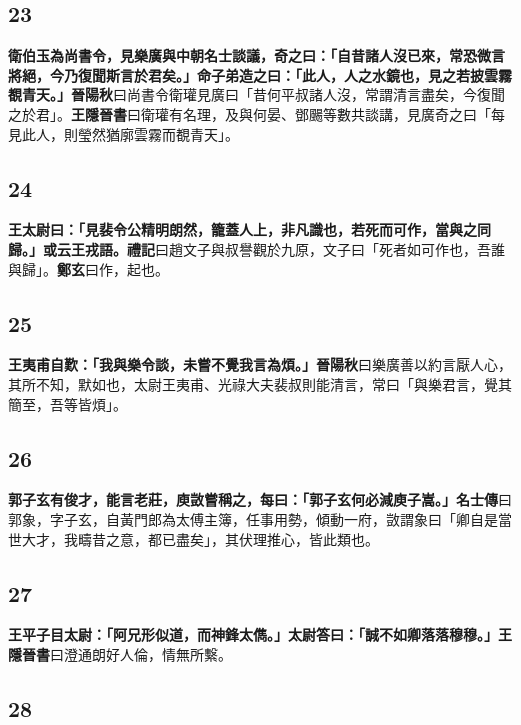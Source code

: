\subsection*{23}

\textbf{衛伯玉為尚書令，見樂廣與中朝名士談議，奇之曰：「自昔諸人沒已來，常恐微言將絕，今乃復聞斯言於君矣。」命子弟造之曰：「此人，人之水鏡也，見之若披雲霧覩青天。」}{\footnotesize \textbf{晉陽秋}曰尚書令衛瓘見廣曰「昔何平叔諸人沒，常謂清言盡矣，今復聞之於君」。\textbf{王隱晉書}曰衛瓘有名理，及與何晏、鄧颺等數共談講，見廣奇之曰「每見此人，則瑩然猶廓雲霧而覩青天」。}

\subsection*{24}

\textbf{王太尉曰：「見裴令公精明朗然，籠蓋人上，非凡識也，若死而可作，當與之同歸。」或云王戎語。}{\footnotesize \textbf{禮記}曰趙文子與叔譽觀於九原，文子曰「死者如可作也，吾誰與歸」。\textbf{鄭玄}曰作，起也。}

\subsection*{25}

\textbf{王夷甫自歎：「我與樂令談，未嘗不覺我言為煩。」}{\footnotesize \textbf{晉陽秋}曰樂廣善以約言厭人心，其所不知，默如也，太尉王夷甫、光祿大夫裴叔則能清言，常曰「與樂君言，覺其簡至，吾等皆煩」。}

\subsection*{26}

\textbf{郭子玄有俊才，能言老莊，庾敳嘗稱之，每曰：「郭子玄何必減庾子嵩。」}{\footnotesize \textbf{名士傳}曰郭象，字子玄，自黃門郎為太傅主簿，任事用勢，傾動一府，敳謂象曰「卿自是當世大才，我疇昔之意，都已盡矣」，其伏理推心，皆此類也。}

\subsection*{27}

\textbf{王平子目太尉：「阿兄形似道，而神鋒太儁。」太尉答曰：「誠不如卿落落穆穆。」}{\footnotesize \textbf{王隱晉書}曰澄通朗好人倫，情無所繫。}

\subsection*{28}


